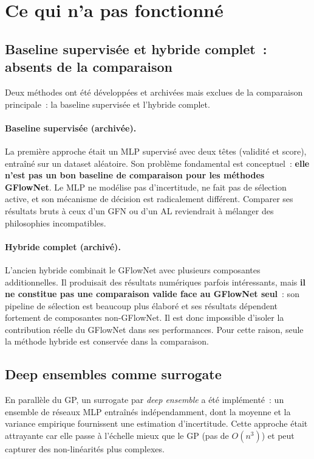 \documentclass[10pt]{article}
\begin{document}
\section{Ce qui n'a pas fonctionné}
\label{sec:failed}

\subsection{Baseline supervisée et hybride complet~: absents de la comparaison}

Deux méthodes ont été développées et archivées mais exclues de la comparaison principale~: la baseline supervisée et l'hybride complet.

\paragraph{Baseline supervisée (archivée).}
La première approche était un MLP supervisé avec deux têtes (validité et score), entraîné sur un dataset aléatoire. Son problème fondamental est conceptuel~: \textbf{elle n'est pas un bon baseline de comparaison pour les méthodes GFlowNet}. Le MLP ne modélise pas d'incertitude, ne fait pas de sélection active, et son mécanisme de décision est radicalement différent. Comparer ses résultats bruts à ceux d'un GFN ou d'un AL reviendrait à mélanger des philosophies incompatibles.

\paragraph{Hybride complet (archivé).}
L'ancien hybride combinait le GFlowNet avec plusieurs composantes additionnelles. Il produisait des résultats numériques parfois intéressants, mais \textbf{il ne constitue pas une comparaison valide face au GFlowNet seul}~: son pipeline de sélection est beaucoup plus élaboré et ses résultats dépendent fortement de composantes non-GFlowNet. Il est donc impossible d'isoler la contribution réelle du GFlowNet dans ses performances. Pour cette raison, seule la méthode hybride est conservée dans la comparaison.

\subsection{Deep ensembles comme surrogate}

En parallèle du GP, un surrogate par \emph{deep ensemble} a été implémenté~: un ensemble de réseaux MLP entraînés indépendamment, dont la moyenne et la variance empirique fournissent une estimation d'incertitude. Cette approche était attrayante car elle passe à l'échelle mieux que le GP (pas de $O(n^3)$) et peut capturer des non-linéarités plus complexes.
\end{document}
